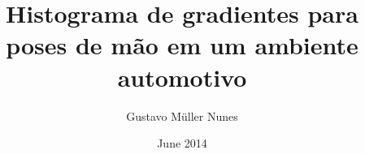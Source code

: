 \documentclass[a4paper,11pt,oneside]{book}
\begin{document}
\author{Gustavo Müller Nunes}
\title{Histograma de gradientes para poses de mão em um ambiente automotivo}
\date{June 2014}

\maketitle
\tableofcontents 	%
\listoftables 		%
\listoffigures 		%

%


%
%
\end{document}
